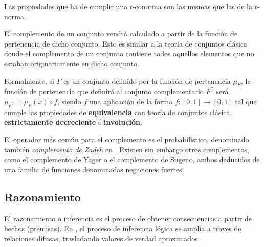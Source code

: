 Las propiedades que ha de cumplir una $t$-conorma son las mismas que las de la $t$-norma.

El complemento de un conjunto vendrá calculado a partir de la función de pertenencia de dicho conjunto. Esto es similar a la teoría de conjuntos clásica donde el complemento de un conjunto contiene todos aquellos elementos que no estaban originariamente en dicho conjunto.

Formalmente, si $F$ es un conjunto definido por la función de pertenencia $\mu_F$, la función de pertenencia que definirá al conjunto complementario $F^\complement$ será $\mu_{F^\complement} = \mu_F(x) \circ f$, siendo $f$ una aplicación de la forma $f : [0,1] \rightarrow [0,1]$ tal que cumple las propiedades de \textbf{equivalencia} con teoría de conjuntos clásica, \textbf{estrictamente decreciente} e \textbf{involución}.

El operador más común para el complemento es el probabilístico, denominado también \textit{complemento de Zadeh} en . Existen sin embargo otros complementos, como el complemento de Yager o el complemento de Sugeno, ambos deducidos de una familia de funciones denominadas negaciones fuertes.

\subsection{Razonamiento}

El razonamiento o inferencia es el proceso de obtener consecuencias a partir de hechos (premisas). En , el proceso de inferencia lógica se amplía a través de relaciones difusas, trasladando valores de verdad aproximados.

